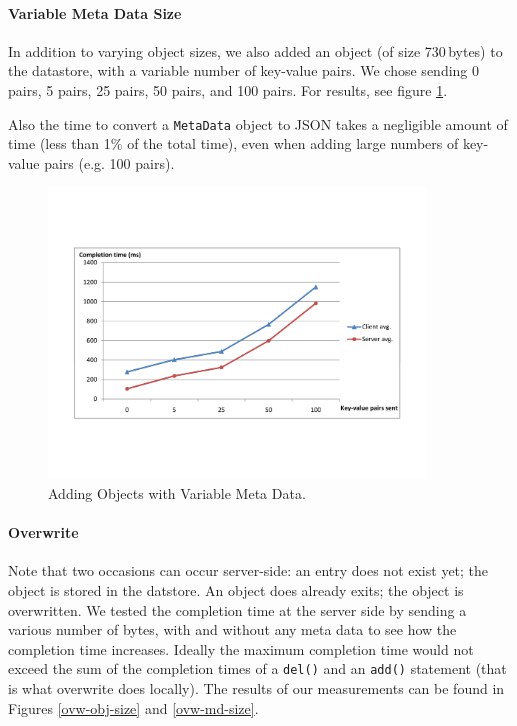 \paragraph{Variable Meta Data Size}
In addition to varying object sizes, we also added an object (of size 730\,bytes)
to the datastore, with a variable number of key-value pairs. We chose sending 0
pairs, 5 pairs, 25 pairs, 50 pairs, and 100 pairs. For results, see figure
\ref{add-md-size}.

Also the time to convert a \texttt{MetaData} object to JSON takes a negligible
amount of time (less than 1\% of the total time), even when adding large numbers
of key-value pairs (e.g. 100 pairs).

\begin{figure} %
\begin{center}
\includegraphics[trim=5cm 4cm 5cm 5cm,width=10cm]{./figures/add_md.pdf}
\caption{Adding Objects with Variable Meta Data. \label{add-md-size}}
\end{center}
\end{figure}

\paragraph{Overwrite}
Note that two occasions can occur server-side: an entry does not exist yet; the
object is stored in the datstore. An object does already exits; the object is
overwritten. We tested the completion time at the server side by sending a
various number of bytes, with and without any meta data to see how the completion
time increases. Ideally the maximum completion time would not exceed the sum of
the completion times of a \texttt{del()} and an \texttt{add()} statement (that is
what overwrite does locally). The results of our measurements can be found in
Figures \ref{ovw-obj-size} and \ref{ovw-md-size}.

